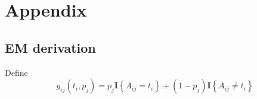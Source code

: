 \documentclass[11pt]{article}
\begin{document}




\clearpage
\section{Appendix}

%
%
%


\subsection*{EM derivation}
Define
\[
g_{ij}(t_i, p_j) = p_j \mathbf{I} \left\lbrace  A_{ij}=  t_i  \right\rbrace +  (1-p_j ) \mathbf{I} \left\lbrace  A_{ij} \neq  t_i  \right\rbrace
\]
\end{document}
